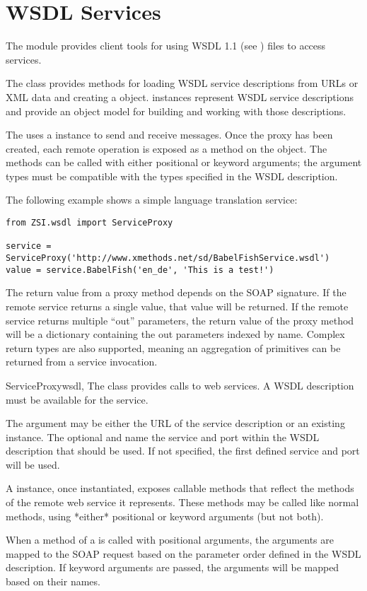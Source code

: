 \chapter{WSDL Services}

The  module provides client tools for using WSDL 1.1
(see )
files to access services.

The  class provides methods for loading WSDL service 
descriptions from URLs or XML data and creating a  object.
 instances represent WSDL service descriptions and provide 
an object model for building and working with those descriptions.

The  uses a  instance to send
and receive messages.
Once the proxy has been created, each remote operation is exposed
as a method on the object.
The methods can be called with either positional or keyword arguments;
the argument types must be compatible with the types specified in the
WSDL description.

The following example shows a simple language translation service:

\begin{verbatim}
from ZSI.wsdl import ServiceProxy

service = ServiceProxy('http://www.xmethods.net/sd/BabelFishService.wsdl')
value = service.BabelFish('en_de', 'This is a test!')
\end{verbatim}

The return value from a proxy method depends on the SOAP signature. If the 
remote service returns a single value, that value will be returned. If the 
remote service returns multiple ``out'' parameters, the return value of the 
proxy method will be a dictionary containing the out parameters indexed by 
name.  Complex return types are also supported, meaning an aggregation of
primitives can be returned from a service invocation.


\begin{classdesc}{ServiceProxy}{wsdl,}
The  class provides calls to
web services. A WSDL description must be available for the 
service.

The  argument may be either the URL of the service description 
or an existing  instance. The optional  and 
 name the service and port within the WSDL description that 
should be used. If not specified, the first defined service and port 
will be used.

A  instance, once instantiated, exposes callable 
methods that reflect the methods of the remote web service it 
represents. These methods may be called like normal methods, using 
*either* positional or keyword arguments (but not both).

When a method of a  is called with positional 
arguments, the arguments are mapped to the SOAP request based on 
the parameter order defined in the WSDL description. If keyword 
arguments are passed, the arguments will be mapped based on their 
names.

\end{classdesc}

